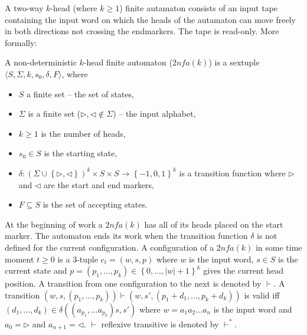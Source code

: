 \documentclass{llncs}
\begin{document}
\begin{definicija}
A two-way $k$-head (where $k\geq 1$) finite autamaton consists of an input tape containing the input word on which the heads of the autamaton can move freely in both directions not crossing the endmarkers. The tape is read-only. More formally:
\begin{definition}
A non-deterministic $k$-head finite automaton ($2nfa(k)$) is a sextuple $\langle S, \Sigma, k, s_0, \delta, F \rangle$, where
\begin{itemize}
	\item $S$ a finite set -- the set of states,
	\item $\Sigma$ is a finite set ($ \triangleright,\triangleleft \notin \Sigma$) -- the input alphabet,
	\item $k\geq 1$ is the number of heads, 
	\item $s_0\in S$ is the starting state,
	\item $\delta: \left( \Sigma \cup \left\{ \triangleright, \triangleleft \right\} \right)^k \times S \times S \rightarrow \left\{-1,0,1\right\}^k$ is a transition function where $\triangleright$ and $\triangleleft$ are the start and end markers,
	\item $F \subseteq S$ is the set of accepting states.
\end{itemize}
\end{definition}
At the beginning of work a $2nfa(k)$ has all of its heads placed on the start marker. The automaton ends its work when the transition function $\delta$ is not defined for the current configuration. A configuration of a $2nfa(k)$ in some time moment $t\geq 0$ is a 3-tuple $c_t=\left(w,s,p\right)$ where $w$ is the input word, $s\in S$ is the current state and
$p = \left( p_1, \ldots, p_k \right) \in \left\{ 0, \ldots, |w| +1 \right\}^k $
gives the current head position. A transition from one configuration to the next is denoted by $\vdash$. A transition
$\left( w, s, \left( p_1, \ldots, p_k \right) \right) \vdash \left( w, s', \left( p_1+d_1, \ldots, p_k+d_k \right) \right)$
is valid iff
$\left(d_1, \ldots, d_k \right) \in \delta \left( \left( a_{p_1}, \ldots a_{p_k} \right) s, s' \right)$
where $w = a_1a_2 \ldots a_n$ is the input word and $a_0=\triangleright$ and $a_{n+1}=\triangleleft$. $\vdash$ reflexive transitive %
is denoted by $\vdash^*$.


\end{definicija}
\end{document}
